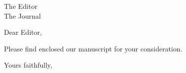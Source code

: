\documentclass{letter}
\begin{document}
\begin{letter}{The Editor \\ The Journal}
\opening{Dear Editor,}

Please find enclosed our manuscript for your consideration.

\closing{Yours faithfully,}
\end{letter}
\end{document}
